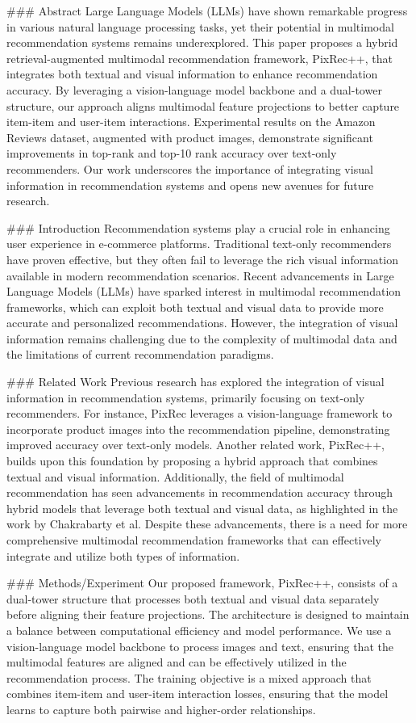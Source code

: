### Abstract
Large Language Models (LLMs) have shown remarkable progress in various natural language processing tasks, yet their potential in multimodal recommendation systems remains underexplored. This paper proposes a hybrid retrieval-augmented multimodal recommendation framework, PixRec++, that integrates both textual and visual information to enhance recommendation accuracy. By leveraging a vision-language model backbone and a dual-tower structure, our approach aligns multimodal feature projections to better capture item-item and user-item interactions. Experimental results on the Amazon Reviews dataset, augmented with product images, demonstrate significant improvements in top-rank and top-10 rank accuracy over text-only recommenders. Our work underscores the importance of integrating visual information in recommendation systems and opens new avenues for future research.

### Introduction
Recommendation systems play a crucial role in enhancing user experience in e-commerce platforms. Traditional text-only recommenders have proven effective, but they often fail to leverage the rich visual information available in modern recommendation scenarios. Recent advancements in Large Language Models (LLMs) have sparked interest in multimodal recommendation frameworks, which can exploit both textual and visual data to provide more accurate and personalized recommendations. However, the integration of visual information remains challenging due to the complexity of multimodal data and the limitations of current recommendation paradigms.

### Related Work
Previous research has explored the integration of visual information in recommendation systems, primarily focusing on text-only recommenders. For instance, PixRec leverages a vision-language framework to incorporate product images into the recommendation pipeline, demonstrating improved accuracy over text-only models. Another related work, PixRec++, builds upon this foundation by proposing a hybrid approach that combines textual and visual information. Additionally, the field of multimodal recommendation has seen advancements in recommendation accuracy through hybrid models that leverage both textual and visual data, as highlighted in the work by Chakrabarty et al. Despite these advancements, there is a need for more comprehensive multimodal recommendation frameworks that can effectively integrate and utilize both types of information.

### Methods/Experiment
Our proposed framework, PixRec++, consists of a dual-tower structure that processes both textual and visual data separately before aligning their feature projections. The architecture is designed to maintain a balance between computational efficiency and model performance. We use a vision-language model backbone to process images and text, ensuring that the multimodal features are aligned and can be effectively utilized in the recommendation process. The training objective is a mixed approach that combines item-item and user-item interaction losses, ensuring that the model learns to capture both pairwise and higher-order relationships.

